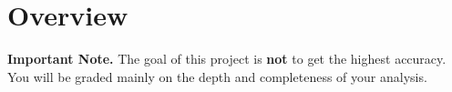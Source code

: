 \newif\ifshowsolutions
\showsolutionstrue
\newcommand{\solutionname}{Answer}

\graphicspath{{../figs/}}



\pagestyle{fancy}

\section{Overview}

\noindent
\textbf{Important Note.} The goal of this project is \textbf{not} to get the highest
accuracy. You will be graded mainly on the depth and completeness of your analysis.

